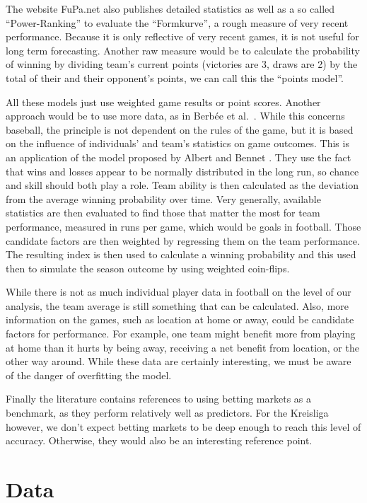 \documentclass[12pt,a4paper]{article}
\begin{document}
The website FuPa.net \autocite*{fupa} also publishes detailed statistics
as well as a so called \enquote{Power-Ranking} to evaluate the
\enquote{Formkurve}, a rough measure of very recent performance. Because
it is only reflective of very recent games, it is not useful for long
term forecasting. Another raw measure would be to calculate the
probability of winning by dividing team's current points (victories are
3, draws are 2) by the total of their and their opponent's points, we
can call this the \enquote{points model}.

All these models just use weighted game results or point scores. Another
approach would be to use more data, as in Berbée et
al.~\autocite*{baseball}. While this concerns baseball, the principle is
not dependent on the rules of the game, but it is based on the influence
of individuals' and team's statistics on game outcomes. This is an
application of the model proposed by Albert and Bennet
\autocite*{albert2007}. They use the fact that wins and losses appear to
be normally distributed in the long run, so chance and skill should both
play a role. Team ability is then calculated as the deviation from the
average winning probability over time. Very generally, available
statistics are then evaluated to find those that matter the most for
team performance, measured in runs per game, which would be goals in
football. Those candidate factors are then weighted by regressing them
on the team performance. The resulting index is then used to calculate a
winning probability and this used then to simulate the season outcome by
using weighted coin-flips.

While there is not as much individual player data in football on the
level of our analysis, the team average is still something that can be
calculated. Also, more information on the games, such as location at
home or away, could be candidate factors for performance. For example,
one team might benefit more from playing at home than it hurts by being
away, receiving a net benefit from location, or the other way around.
While these data are certainly interesting, we must be aware of the
danger of overfitting the model.

Finally the literature contains references to using betting markets as a
benchmark, as they perform relatively well as predictors. For the
Kreisliga however, we don't expect betting markets to be deep enough to
reach this level of accuracy. Otherwise, they would also be an
interesting reference point.

\hypertarget{data}{%
\section{Data}\label{data}}
\end{document}
